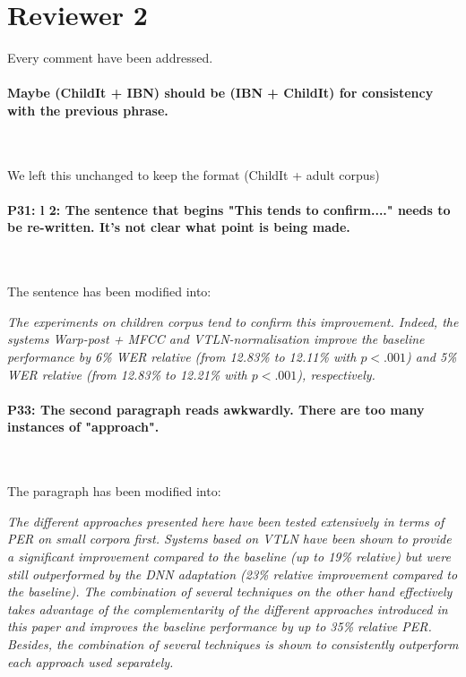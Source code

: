 \documentclass[]{article}
\begin{document}
\section{Reviewer 2}

Every comment have been addressed.

\paragraph{Maybe (ChildIt + IBN) should be (IBN + ChildIt) for consistency with the previous phrase.}

~

We left this unchanged to keep the format (ChildIt + adult corpus)

\paragraph{P31: l 2: The sentence that begins "This tends to confirm...." needs to be re-written. It's not clear what point is being made.}

~

The sentence has been modified into:

\textit{The experiments on children corpus tend to confirm this improvement. Indeed, the systems {\em Warp-post + MFCC} and {\em VTLN-normalisation} improve the baseline performance by 6\% WER relative (from 12.83\% to 12.11\% with $p<.001$) and 5\% WER relative (from 12.83\% to 12.21\% with $p<.001$), respectively.}

\paragraph{P33: The second paragraph reads awkwardly. There are too many instances of "approach".}

~

The paragraph has been modified into: 

\textit{The different approaches presented here have been tested extensively in terms of PER on small corpora first. Systems based on VTLN have been shown to provide a significant improvement compared to the baseline (up to 19\% relative) but were still outperformed by the DNN adaptation (23\% relative improvement compared to the baseline). The combination of several techniques on the other hand effectively takes advantage of the complementarity of the different approaches introduced in this paper and improves the baseline performance by up to 35\% relative PER. Besides, the combination of several techniques is shown to consistently outperform each approach used separately.}
\end{document}
